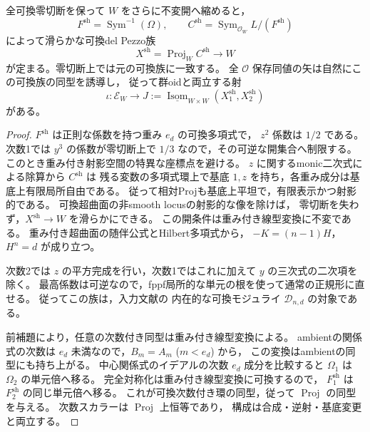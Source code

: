 \begin{lemma}[対称化した中心元の可換模型]
\label{lem:commutative-central-shadow}
全可換零切断を保って $W$ をさらに不変開へ縮めると，
\[
 F^{\mathrm{sh}}=\operatorname{Sym}^{-1}(\Omega),\qquad
 C^{\mathrm{sh}}=\operatorname{Sym}_{\mathcal O_W}L/(F^{\mathrm{sh}})
\]
によって滑らかな可換del Pezzo族
\[
 X^{\mathrm{sh}}=\operatorname{Proj}_W C^{\mathrm{sh}}\longrightarrow W
\]
が定まる。零切断上では元の可換族に一致する。
全 $\mathcal O$ 保存同値の矢は自然にこの可換族の同型を誘導し，
従って群oidと両立する射
\[
 \iota:\mathcal E_W\longrightarrow
 J:=\underline{\operatorname{Isom}}_{W\times W}
        (X^{\mathrm{sh}}_1,X^{\mathrm{sh}}_2)
\]
がある。
\end{lemma}
\begin{proof}
$F^{\mathrm{sh}}$ は正則な係数を持つ重み $e_d$ の可換多項式で，
$z^2$ 係数は $1/2$ である。次数1では $y^3$ の係数が零切断上で
$1/3$ なので，その可逆な開集合へ制限する。
このとき重み付き射影空間の特異な座標点を避ける。
$z$ に関するmonic二次式による除算から $C^{\mathrm{sh}}$ は
残る変数の多項式環上で基底 $1,z$ を持ち，各重み成分は基底上有限局所自由である。
従って相対Projも基底上平坦で，有限表示かつ射影的である。
可換超曲面の非smooth locusの射影的な像を除けば，
零切断を失わず，$X^{\mathrm{sh}}\to W$ を滑らかにできる。
この開条件は重み付き線型変換に不変である。
重み付き超曲面の随伴公式とHilbert多項式から，
$-K=(n-1)H$，$H^n=d$ が成り立つ。

次数2では $z$ の平方完成を行い，次数1ではこれに加えて
$y$ の三次式の二次項を除く。
最高係数は可逆なので，fppf局所的な単元の根を使って通常の正規形に直せる。
従ってこの族は，入力文献\cite[定理8.8]{PoissonDP}の
内在的な可換モジュライ $\mathcal D_{n,d}$ の対象である。

前補題により，任意の次数付き同型は重み付き線型変換による。
ambientの関係式の次数は $e_d$ 未満なので，$B_m=A_m$ ($m<e_d$) から，
この変換はambientの同型にも持ち上がる。
中心関係式のイデアルの次数 $e_d$ 成分を比較すると
$\Omega_1$ は $\Omega_2$ の単元倍へ移る。
完全対称化は重み付き線型変換に可換するので，
$F^{\mathrm{sh}}_1$ は $F^{\mathrm{sh}}_2$ の同じ単元倍へ移る。
これが可換次数付き環の同型，従って $\operatorname{Proj}$ の同型を与える。
次数スカラーは $\operatorname{Proj}$ 上恒等であり，
構成は合成・逆射・基底変更と両立する。
\end{proof}

